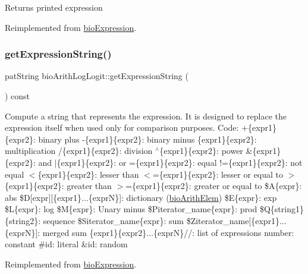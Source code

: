 \begin{DoxyReturn}{Returns}
printed expression 
\end{DoxyReturn}


Reimplemented from \hyperlink{classbio_expression_a66a83eb0caac18dd5e568ffde5a8b5d4}{bio\+Expression}.

\mbox{\label{classbio_arith_log_logit_aa769251f7090278fdae9bd7a03670a53}} 
\subsubsection{\texorpdfstring{get\+Expression\+String()}{getExpressionString()}}
{\footnotesize\ttfamily pat\+String bio\+Arith\+Log\+Logit\+::get\+Expression\+String (\begin{DoxyParamCaption}{ }\end{DoxyParamCaption}) const\hspace{0.3cm}{\ttfamily [virtual]}}

Compute a string that represents the expression. It is designed to replace the expression itself when used only for comparison purposes. Code\+: +\{expr1\}\{expr2\}\+: binary plus -\/\{expr1\}\{expr2\}\+: binary minus \{expr1\}\{expr2\}\+: multiplication /\{expr1\}\{expr2\}\+: division $^\wedge$\{expr1\}\{expr2\}\+: power \&\{expr1\}\{expr2\}\+: and $\vert$\{expr1\}\{expr2\}\+: or =\{expr1\}\{expr2\}\+: equal !=\{expr1\}\{expr2\}\+: not equal $<$\{expr1\}\{expr2\}\+: lesser than $<$=\{expr1\}\{expr2\}\+: lesser or equal to $>$\{expr1\}\{expr2\}\+: greater than $>$=\{expr1\}\{expr2\}\+: greater or equal to \$A\{expr\}\+: abs \$D\mbox{[}expr\mbox{]}\mbox{[}\{expr1\}...\{exprN\}\mbox{]}\+: dictionary (\hyperlink{classbio_arith_elem}{bio\+Arith\+Elem}) \$E\{expr\}\+: exp \$L\{expr\}\+: log \$M\{expr\}\+: Unary minus \$\+Piterator\+\_\+name\{expr\}\+: prod \$Q\{string1\}\{string2\}\+: sequence \$\+Siterator\+\_\+name\{expr\}\+: sum \$\+Ziterator\+\_\+name\mbox{[}\{expr1\}...\{exprN\}\mbox{]}\+: merged sum \{expr1\}\{expr2\}...\{exprN\}//\+: list of expressions number\+: constant \#id\+: literal \&id\+: random 

Reimplemented from \hyperlink{classbio_expression_a3e4b4dca58dbbc6f0e411b30eb3f60b4}{bio\+Expression}.

\mbox{\label{classbio_arith_log_logit_a4283d349360bfc928c2f20aa2e235e0c}} 
